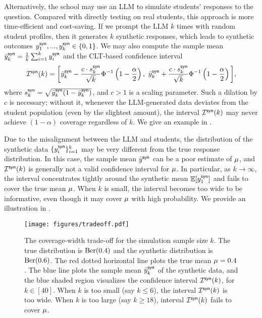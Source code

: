 Alternatively, the school may use an LLM to simulate students' responses to the question. Compared with directly testing on real students, this approach is more time-efficient and cost-saving. If we prompt the LLM $k$ times with random student profiles, then it generates $k$ synthetic responses, which leads to synthetic outcomes $y^{\mathsf{syn}}_1,...,y^{\mathsf{syn}}_k\in\{0,1\}$. We may also compute the sample mean $\bar{y}^{\mathsf{syn}}_k = \frac{1}{k} \sum_{i=1}^k y^{\mathsf{syn}}_i$ and the CLT-based confidence interval
\begin{equation}\label{eqn-CI-intro-sim}
\mathcal{I}^{\mathsf{syn}}(k) =  \bigg[ \bar{y}^{\mathsf{syn}}_k - \frac{c\cdot s^{\mathsf{syn}}_k}{\sqrt{k}} \Phi^{-1}\left( 1- \frac{\alpha}{2} \right) , 
~
\bar{y}^{\mathsf{syn}}_k + \frac{c\cdot s^{\mathsf{syn}}_k}{\sqrt{k}} \Phi^{-1}\left( 1 - \frac{\alpha}{2} \right) \bigg],
\end{equation}
where $s^{\mathsf{syn}}_k = \sqrt{\bar{y}^{\mathsf{syn}}_k (1-\bar{y}^{\mathsf{syn}}_k)}$, and $c>1$ is a scaling parameter. Such a dilation by $c$ is necessary; without it, whenever the LLM-generated data deviates from the student population (even by the slightest amount), the interval $\mathcal{I}^{\mathsf{syn}}(k)$ may never achieve $(1-\alpha)$ coverage regardless of $k$. We give an example in .

Due to the misalignment between the LLM and students, the distribution of the synthetic data $\{y^{\mathsf{syn}}_i\}_{i=1}^k$ may be very different from the true response distribution. In this case, the sample mean $\bar{y}^{\mathsf{syn}}$ can be a poor estimate of 
$\mu$, and $\mathcal{I}^{\mathsf{syn}}(k)$ is generally not a valid confidence interval for $\mu$. In particular, as $k\to\infty$, the interval concentrates tightly around the synthetic mean $\mathbb{E} [y^{\mathsf{syn}}_1]$ and fails to cover the true mean $\mu$. When $k$ is small, the interval becomes too wide to be informative, even though it may cover $\mu$ with high probability. We provide an illustration in .

\begin{figure}[h]
\centering
\texttt{[image: figures/tradeoff.pdf]}
\caption{The coverage-width trade-off for the simulation sample size $k$. The true distribution is ${\rm Ber}(0.4)$ and the synthetic distribution is ${\rm Ber}(0.6)$. The red dotted horizontal line plots the true mean $\mu=0.4$. The blue line plots the sample mean $\bar{y}^{\mathsf{syn}}_k$ of the synthetic data, and the blue shaded region visualizes the confidence interval $\mathcal{I}^{\mathsf{syn}}(k)$, for $k\in[40]$. When $k$ is too small (say $k\le 6$), the interval $\mathcal{I}^{\mathsf{syn}}(k)$ is too wide. When $k$ is too large (say $k\ge 18$), interval $\mathcal{I}^{\mathsf{syn}}(k)$ fails to cover $\mu$.}\label{fig-tradeoff}
\end{figure}

